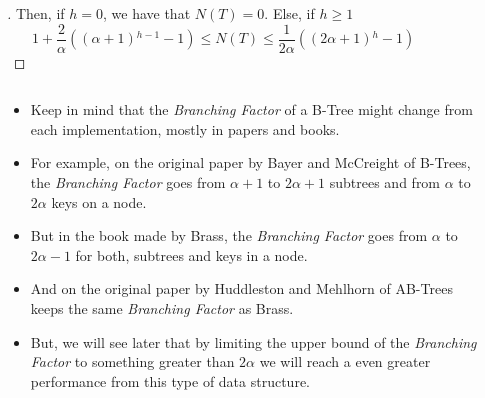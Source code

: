 \begin{frame}[allowframebreaks]
\begin{columns}
\begin{column}{\textlecolumn}
\begin{block}{}
\begin{proof}[\unskip\nopunct]
                    Then, if \(h = 0\), we have that \(N\left(T\right) = 0\). Else, if \(h \geq 1\)
                    \[
                        1 + \frac{2}{\alpha}\left(\left(\alpha + 1\right){}^{h - 1} - 1\right) 
                        \leq 
                        N\left(T\right) 
                        \leq 
                        \frac{1}{2\alpha}\left(\left(2\alpha + 1\right){}^{h} - 1\right)
                        \tag{Nodes Bounds}\label{btree-nodes-num}
                    \]
                \end{proof}
            \end{block}
        \end{column}
        \begin{column}{\textricolumn}
        \end{column}
    \end{columns}

    \framebreak{}

    \begin{columns}
        \begin{column}{\textlecolumn}
            \begin{block}{}
                \begin{itemize}
                    \item Keep in mind that the \emph{Branching Factor} of a B-Tree might change from each implementation, mostly in papers and books.
                    \item For example, on the original paper by Bayer and McCreight of B-Trees\cite{bayer_organization_1972}, the \emph{Branching Factor} 
                        goes from \(\alpha + 1\) to \(2\alpha + 1\) subtrees and from \(\alpha\) to \(2\alpha\) keys on a node.
                    \item But in the book made by Brass\cite{brass_advanced_2008}, the \emph{Branching Factor} goes from 
                        \(\alpha\) to \(2\alpha - 1\) for both, subtrees and keys in a node.
                    \item And on the original paper by Huddleston and Mehlhorn of AB-Trees\cite{huddleston_new_1982} keeps the same \emph{Branching Factor} as Brass.
                    \item But, we will see later that by limiting the upper bound of the \emph{Branching Factor} to something greater than \(2\alpha\) 
                        we will reach a even greater performance from this type of data structure.
                \end{itemize}
            \end{block}
        \end{column}
        \begin{column}{\textricolumn}
        \end{column}
    \end{columns}

\end{frame}
